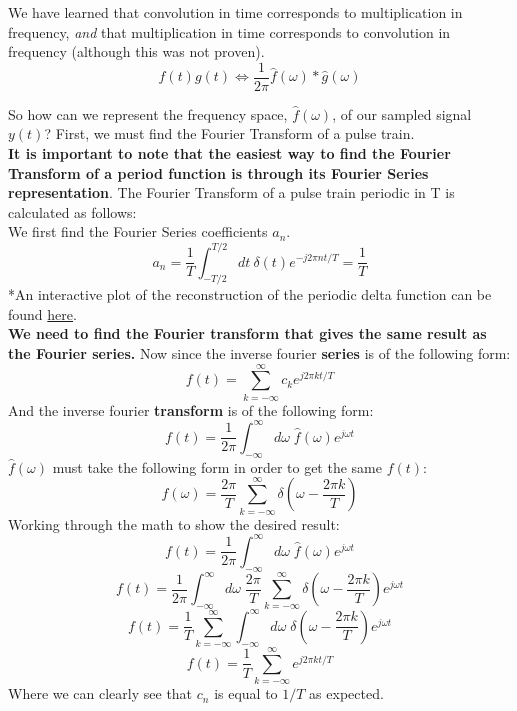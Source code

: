 \documentclass[a4paper]{article}
\numberwithin{equation}{section}
\begin{document}
We have learned that convolution in time corresponds to multiplication in frequency, \textit{and} that multiplication in time corresponds to convolution in frequency (although this was not proven). 
\begin{equation}
f(t)g(t) \Longleftrightarrow \frac{1}{2\pi} \hat{f}(\omega)*\hat{g}(\omega)
\end{equation}

So how can we represent the frequency space, $\hat{f}(\omega)$, of our sampled signal $y(t)$? First, we must find the Fourier Transform of a pulse train.\\

\textbf{It is important to note that the easiest way to find the Fourier Transform of a period function is through its Fourier Series representation}. The Fourier Transform of a pulse train periodic in T is calculated as follows:\\

We first find the Fourier Series coefficients $a_n$. 
\begin{equation}
a_n = \frac{1}{T}\int_{-T/2}^{T/2}dt\: \delta (t) e^{-j 2 \pi n t /T} = \frac{1}{T}
\end{equation}
*An interactive plot of the reconstruction of the periodic delta function can be found \href{https://www.desmos.com/calculator/jcrawlfvwc}{here}.\\

\textbf{We need to find the Fourier transform that gives the same result as the Fourier series.}
Now since the inverse fourier \textbf{series} is of the following form:
\begin{equation}
f(t)=\sum_{k=-\infty}^{\infty}c_k e^{j2\pi kt/T}
\end{equation}
And the inverse fourier \textbf{transform} is of the following form:
\begin{equation}
f(t)=\frac{1}{2\pi}\int_{-\infty}^{\infty} d\omega \; \hat{f}(\omega) e^{j\omega t}
\end{equation}
$\hat{f}(\omega)$ must take the following form in order to get the same $f(t)$:
\begin{equation}
\hat{f}(\omega)=\frac{2\pi}{T}\sum_{k=-\infty}^{\infty}\delta(\omega-\frac{2\pi k}{T})
\end{equation}
Working through the math to show the desired result:
\begin{equation}
f(t)=\frac{1}{2\pi}\int_{-\infty}^{\infty} d\omega \; \hat{f}(\omega) e^{j\omega t}
\end{equation}
\begin{equation}
f(t)=\frac{1}{2\pi}\int_{-\infty}^{\infty} d\omega \; \frac{2\pi}{T}\sum_{k=-\infty}^{\infty}\delta(\omega-\frac{2\pi k}{T}) e^{j\omega t}
\end{equation}
\begin{equation}
f(t)=\frac{1}{T}\sum_{k=-\infty}^{\infty}\int_{-\infty}^{\infty} d\omega \; \delta(\omega-\frac{2\pi k}{T}) e^{j\omega t}
\end{equation}
\begin{equation}
f(t)=\frac{1}{T}\sum_{k=-\infty}^{\infty}e^{j2\pi k t/T}
\end{equation}
Where we can clearly see that $c_n$ is equal to $1/T$ as expected.\\
\end{document}

